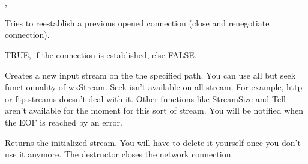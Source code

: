 \section{}\label{wxprotocol}




, 


\label{wxprotoreconnect}


Tries to reestablish a previous opened connection (close and renegotiate connection).


TRUE, if the connection is established, else FALSE.

\label{wxprotogetinput}


Creates a new input stream on the the specified path. You can use all but seek
functionnality of wxStream. Seek isn't available on all stream. For example,
http or ftp streams doesn't deal with it. Other functions like StreamSize and
Tell aren't available for the moment for this sort of stream.
You will be notified when the EOF is reached by an error.


Returns the initialized stream. You will have to delete it yourself once you
don't use it anymore. The destructor closes the network connection.



\label{wxprotoabort}


